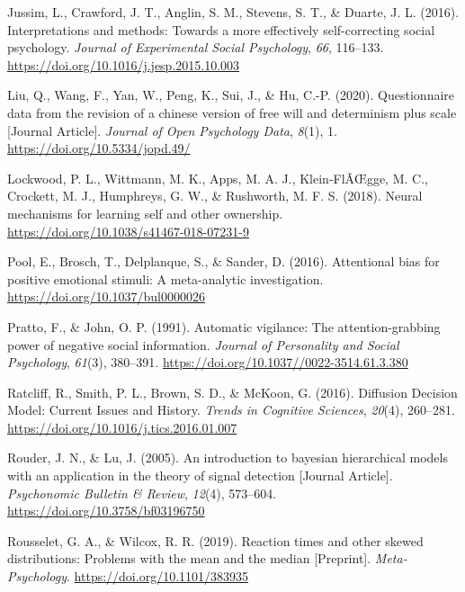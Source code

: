 \documentclass[
  man]{apa6}
\newlength{\cslhangindent}
\newlength{\cslentryspacingunit} %
\newenvironment{CSLReferences}[2] %
 {%
  \setlength{\parindent}{0pt}
  \ifodd #1
  \let\oldpar\par
  \def\par{\hangindent=\cslhangindent\oldpar}
  \fi
  \setlength{\parskip}{#2\cslentryspacingunit}
 }%
 {}
\begin{document}
\begin{CSLReferences}{1}{0}
\leavevmode{}%
Jussim, L., Crawford, J. T., Anglin, S. M., Stevens, S. T., \& Duarte, J. L. (2016). Interpretations and methods: {Towards} a more effectively self-correcting social psychology. \emph{Journal of Experimental Social Psychology}, \emph{66}, 116--133. \url{https://doi.org/10.1016/j.jesp.2015.10.003}

\leavevmode{}%
Liu, Q., Wang, F., Yan, W., Peng, K., Sui, J., \& Hu, C.-P. (2020). Questionnaire data from the revision of a chinese version of free will and determinism plus scale {[}Journal Article{]}. \emph{Journal of Open Psychology Data}, \emph{8}(1), 1. \url{https://doi.org/10.5334/jopd.49/}

\leavevmode{}%
Lockwood, P. L., Wittmann, M. K., Apps, M. A. J., Klein-FlÃŒgge, M. C., Crockett, M. J., Humphreys, G. W., \& Rushworth, M. F. S. (2018). Neural mechanisms for learning self and other ownership. \url{https://doi.org/10.1038/s41467-018-07231-9}

\leavevmode{}%
Pool, E., Brosch, T., Delplanque, S., \& Sander, D. (2016). Attentional bias for positive emotional stimuli: A meta-analytic investigation. \url{https://doi.org/10.1037/bul0000026}

\leavevmode{}%
Pratto, F., \& John, O. P. (1991). Automatic vigilance: The attention-grabbing power of negative social information. \emph{Journal of Personality and Social Psychology}, \emph{61}(3), 380--391. \url{https://doi.org/10.1037//0022-3514.61.3.380}

\leavevmode{}%
Ratcliff, R., Smith, P. L., Brown, S. D., \& McKoon, G. (2016). Diffusion {Decision} {Model}: {Current} {Issues} and {History}. \emph{Trends in Cognitive Sciences}, \emph{20}(4), 260--281. \url{https://doi.org/10.1016/j.tics.2016.01.007}

\leavevmode{}%
Rouder, J. N., \& Lu, J. (2005). An introduction to bayesian hierarchical models with an application in the theory of signal detection {[}Journal Article{]}. \emph{Psychonomic Bulletin \& Review}, \emph{12}(4), 573--604. \url{https://doi.org/10.3758/bf03196750}

\leavevmode{}%
Rousselet, G. A., \& Wilcox, R. R. (2019). Reaction times and other skewed distributions: Problems with the mean and the median {[}Preprint{]}. \emph{Meta-Psychology}. \url{https://doi.org/10.1101/383935}


\end{CSLReferences}
\end{document}
